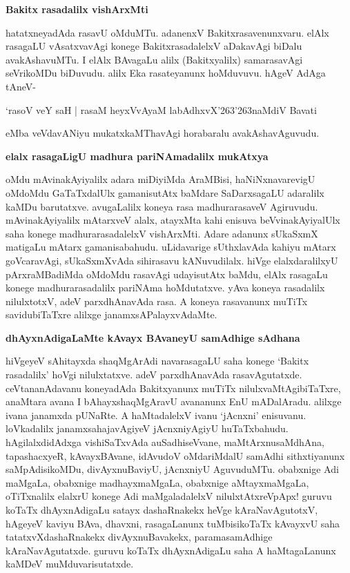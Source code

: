 {\bigskip
\noindent
{\large\bf Bakitx rasadalilx vishArxMti}}\label{page231}
\medskip

\noindent
hatatxneyadAda rasavU oMduMTu. adanenxV Bakitxrasavenunxvaru. elAlx rasagaLU vAsatxvavAgi konege BakitxrasadalelxV aDakavAgi biDalu avakAshavuMTu. I elAlx BAvagaLu alilx (Bakitxyalilx) samarasavAgi seVrikoMDu biDuvudu. alilx Eka rasateyanunx hoMduvuvu. hAgeV AdAga tAneV-

\begin{shloka}
`rasoV veY saH | rasaM heyxVvAyaM labAdhxvX\char'263\char'263naMdiV Bavati\label{231}
\end{shloka}

\noindent
eMba veVdavANiyu mukatxkaMThavAgi horabaralu avakAshavAguvudu.

{\bigskip
\noindent
{\large\bf elalx rasagaLigU madhura pariNAmadalilx mukAtxya}}\label{page231a}
\medskip

\noindent
oMdu mAvinakAyiyalilx adara miDiyiMda AraMBisi, haNiNxnavarevigU oMdoMdu GaTaTxdalUlx gamanisutAtx baMdare SaDarxsagaLU adaralilx kaMDu barutatxve. avugaLalilx koneya rasa madhurarasaveV Agiruvudu. mAvinakAyiyalilx mAtarxveV alalx, atayxMta kahi enisuva beVvinakAyiyalUlx saha konege madhurarasadalelxV vishArxMti. Adare adanunx sUkaSxmX matigaLu mAtarx gamanisabahudu. uLidavarige sUthxlavAda kahiyu mAtarx goVcaravAgi, sUkaSxmXvAda sihirasavu kANuvudilalx. hiVge elalxdaralilxyU pArxraMBadiMda oMdoMdu rasavAgi udayisutAtx baMdu, elAlx rasagaLu konege madhurarasadalilx pariNAma hoMdutatxve. yAva koneya rasadalilx nilulxtotxV, adeV parxdhAnavAda rasa. A koneya rasavanunx muTiTx savidubiTaTxre alilxge janamxsAPalayxvAdaMte.

{\bigskip
\noindent
{\large\bf dhAyxnAdigaLaMte kAvayx BAvaneyU samAdhige sAdhana}}\label{page231b}
\medskip

\noindent
hiVgeyeV sAhitayxda shaqMgArAdi navarasagaLU saha konege `Bakitx rasadalilx' hoVgi nilulxtatxve. adeV parxdhAnavAda rasavAgutatxde. ceVtananAdavanu koneyadAda Bakitxyanunx muTiTx nilulxvaMtAgibiTaTxre, anaMtara avana I bAhayxshaqMgAravU avananunx EnU mADalAradu. alilxge ivana janamxda pUNaRte. A haMtadalelxV ivanu `jAcnxni' enisuvanu. loVkadalilx janamxsahajavAgiyeV jAcnxniyAgiyU huTaTxbahudu. hAgilalxdidAdxga vishiSaTxvAda auSadhiseVvane, maMtArxnusaMdhAna, tapashacxyeR, kAvayxBAvane, idAvudoV oMdariMdalU samAdhi sithxtiyanunx saMpAdisikoMDu, divAyxnuBaviyU, jAcnxniyU AguvuduMTu. obabxnige Adi maMgaLa, obabxnige madhayxmaMgaLa, obabxnige aMtayxmaMgaLa, oTiTxnalilx elalxrU konege Adi maMgaladalelxV nilulxtAtxreVpApx! guruvu koTaTx dhAyxnAdigaLu satayx dashaRnakekx heVge kAraNavAgutotxV, hAgeyeV kaviyu BAva, dhavxni, rasagaLanunx tuMbisikoTaTx kAvayxvU saha tatatxvXdashaRnakekx divAyxnuBavakekx, paramasamAdhige kAraNavAgutatxde. guruvu koTaTx dhAyxnAdigaLu saha A haMtagaLanunx kaMDeV muMduvarisutatxde.

